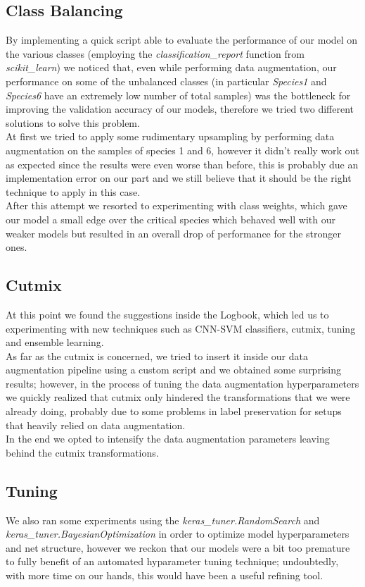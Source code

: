 \documentclass[11pt]{report}
\begin{document}
\subsection{Class Balancing}
By implementing a quick script able to evaluate the performance of our model on the various classes (employing the \textit{classification\_report} function from \textit{scikit\_learn}) we noticed that, even while performing data augmentation, our performance on some of the unbalanced classes (in particular \textit{Species1} and \textit{Species6} have an extremely low number of total samples) was the bottleneck for improving the validation accuracy of our models, therefore we tried two different solutions to solve this problem. \\
At first we tried to apply some rudimentary upsampling by performing data augmentation on the samples of species 1 and 6, however it didn’t really work out as expected since the results were even worse than before, this is probably due an implementation error on our part and we still believe that it should be the right technique to apply in this case. \\
After this attempt we resorted to experimenting with class weights, which gave our model a small edge over the critical species which behaved well with our weaker models but resulted in an overall drop of performance for the stronger ones.

\subsection{Cutmix}
At this point we found the suggestions inside the Logbook, which led us to experimenting with new techniques such as CNN-SVM classifiers, cutmix, tuning and ensemble learning. \\
As far as the cutmix is concerned, we tried to insert it inside our data augmentation pipeline using a custom script and we obtained some surprising results; however, in the process of tuning the data augmentation hyperparameters we quickly realized that cutmix only hindered the transformations that we were already doing, probably due to some problems in label preservation for setups that heavily relied on data augmentation. \\
In the end we opted to intensify the data augmentation parameters leaving behind the cutmix transformations.

\subsection{Tuning}
We also ran some experiments using the \textit{keras\_tuner.RandomSearch} and \textit{keras\_tuner.BayesianOptimization} in order to optimize model hyperparameters and net structure, however we reckon that our models were a bit too premature to fully benefit of an automated hyparameter tuning technique; undoubtedly, with more time on our hands, this would have been a useful refining tool.
\end{document}
